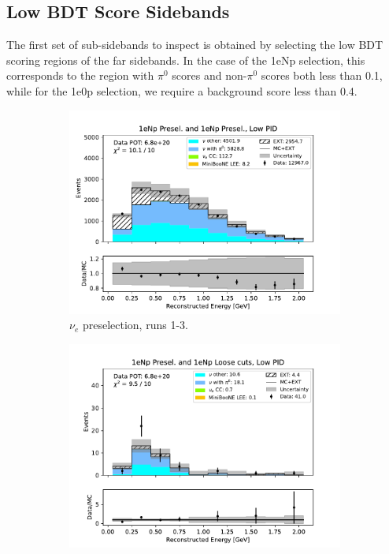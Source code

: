 \subsection{Low BDT Score Sidebands}
\label{sec:LowBDTScoreSidebands}

The first set of sub-sidebands to inspect is obtained by selecting the low BDT scoring regions of the far sidebands. In the case of the 1eNp selection, this corresponds to the region with $\pi^0$ scores and non-$\pi^0$ scores both less than 0.1, while for the 1e0p selection, we require a background score less than 0.4.

\begin{figure}[H]
    \centering
    \begin{subfigure}{0.5\linewidth}
        \includegraphics[width=\linewidth]{technote/Sidebands/Figures/FarSideband/far_sideband_reco_e_run123_NP_NP_LOW_PID.pdf}
        \caption{$\nu_e$ preselection, runs 1-3.}
    \end{subfigure}%
    \begin{subfigure}{0.5\linewidth}
        \includegraphics[width=\linewidth]{technote/Sidebands/Figures/FarSideband/far_sideband_reco_e_run123_NP_NPL_LOW_PID.pdf}

\end{subfigure}
\end{figure}
